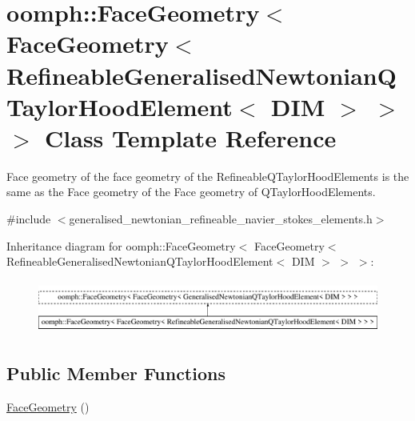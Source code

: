 \hypertarget{classoomph_1_1FaceGeometry_3_01FaceGeometry_3_01RefineableGeneralisedNewtonianQTaylorHoodElement_3_01DIM_01_4_01_4_01_4}{}\section{oomph\+:\+:Face\+Geometry$<$ Face\+Geometry$<$ Refineable\+Generalised\+Newtonian\+Q\+Taylor\+Hood\+Element$<$ D\+IM $>$ $>$ $>$ Class Template Reference}
\label{classoomph_1_1FaceGeometry_3_01FaceGeometry_3_01RefineableGeneralisedNewtonianQTaylorHoodElement_3_01DIM_01_4_01_4_01_4}


Face geometry of the face geometry of the Refineable\+Q\+Taylor\+Hood\+Elements is the same as the Face geometry of the Face geometry of Q\+Taylor\+Hood\+Elements.  




{\ttfamily \#include $<$generalised\+\_\+newtonian\+\_\+refineable\+\_\+navier\+\_\+stokes\+\_\+elements.\+h$>$}

Inheritance diagram for oomph\+:\+:Face\+Geometry$<$ Face\+Geometry$<$ Refineable\+Generalised\+Newtonian\+Q\+Taylor\+Hood\+Element$<$ D\+IM $>$ $>$ $>$\+:\begin{figure}[H]
\begin{center}
\leavevmode
\includegraphics[height=1.774960cm]{classoomph_1_1FaceGeometry_3_01FaceGeometry_3_01RefineableGeneralisedNewtonianQTaylorHoodElement_3_01DIM_01_4_01_4_01_4}
\end{center}
\end{figure}
\subsection*{Public Member Functions}
\begin{DoxyCompactItemize}
\item 
\hyperlink{classoomph_1_1FaceGeometry_3_01FaceGeometry_3_01RefineableGeneralisedNewtonianQTaylorHoodElement_3_01DIM_01_4_01_4_01_4_ad34eb4fcba90736af7510ad1e3233c60}{Face\+Geometry} ()
\end{DoxyCompactItemize}


